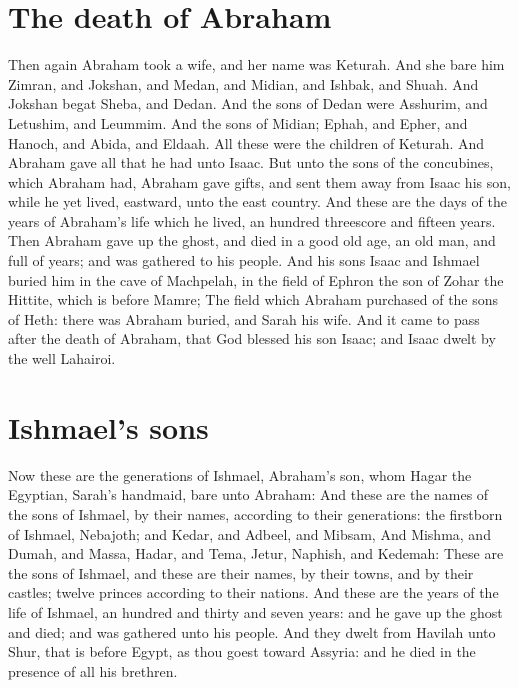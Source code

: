 \section*{The death of Abraham}
\begin{biblechapter} %
\verse Then again Abraham took a wife, and her name was Keturah.
\verse And she bare him Zimran, and Jokshan, and Medan, and Midian, and Ishbak, and Shuah.
\verse And Jokshan begat Sheba, and Dedan. And the sons of Dedan were Asshurim, and Letushim, and Leummim.
\verse And the sons of Midian; Ephah, and Epher, and Hanoch, and Abida, and Eldaah. All these were the children of Keturah.
\verse And Abraham gave all that he had unto Isaac.
\verse But unto the sons of the concubines, which Abraham had, Abraham gave gifts, and sent them away from Isaac his son, while he yet lived, eastward, unto the east country.
\verse And these are the days of the years of Abraham's life which he lived, an hundred threescore and fifteen years.
\verse Then Abraham gave up the ghost, and died in a good old age, an old man, and full of years; and was gathered to his people.
\verse And his sons Isaac and Ishmael buried him in the cave of Machpelah, in the field of Ephron the son of Zohar the Hittite, which is before Mamre;
\verse The field which Abraham purchased of the sons of Heth: there was Abraham buried, and Sarah his wife.
\verse And it came to pass after the death of Abraham, that God blessed his son Isaac; and Isaac dwelt by the well Lahairoi.
\section*{Ishmael's sons}
\verse Now these are the generations of Ishmael, Abraham's son, whom Hagar the Egyptian, Sarah's handmaid, bare unto Abraham:
\verse And these are the names of the sons of Ishmael, by their names, according to their generations: the firstborn of Ishmael, Nebajoth; and Kedar, and Adbeel, and Mibsam,
\verse And Mishma, and Dumah, and Massa,
\verse Hadar, and Tema, Jetur, Naphish, and Kedemah:
\verse These are the sons of Ishmael, and these are their names, by their towns, and by their castles; twelve princes according to their nations.
\verse And these are the years of the life of Ishmael, an hundred and thirty and seven years: and he gave up the ghost and died; and was gathered unto his people.
\verse And they dwelt from Havilah unto Shur, that is before Egypt, as thou goest toward Assyria: and he died in the presence of all his brethren.

\end{biblechapter}
